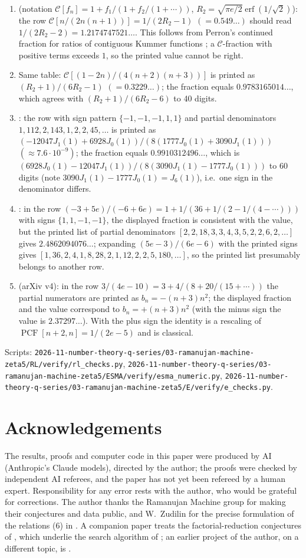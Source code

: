 \documentclass[11pt]{amsart}
\theoremstyle{definition}
\theoremstyle{remark}
\numberwithin{equation}{section}
\newcommand{\PCF}{\operatorname{PCF}}
\newcommand{\file}[1]{\nolinkurl{2026-11-number-theory-q-series/03-ramanujan-machine-zeta5/#1}}
\begin{document}
\begin{enumerate}[leftmargin=1.5em]
\item \cite[Table~3, arXiv v2]{BHK} (notation $\mathcal C[f_n]=1+f_1/(1+f_2/(1+\cdots))$, $R_2=\sqrt{\pi e/2}\operatorname{erf}(1/\sqrt2)$): the row $\mathcal C[n/(2n(n+1))]=1/(2R_2-1)$ $(=0.549\ldots)$ should read $1/(2R_2-2)=1.2174747521\ldots$. This follows from Perron's continued fraction for ratios of contiguous Kummer functions \cite[vol.~II]{Per}; a $\mathcal C$-fraction with positive terms exceeds $1$, so the printed value cannot be right.
\item Same table: $\mathcal C[(1-2n)/(4(n+2)(n+3))]$ is printed as $(R_2+1)/(6R_2-1)$ $(=0.3229\ldots)$; the fraction equals $0.9783165014\ldots$, which agrees with $(R_2+1)/(6R_2-6)$ to 40 digits.
\item \cite[Table~3, arXiv v2]{ESMA}: the row with sign pattern $\{-1,-1,-1,1,1\}$ and partial denominators $1,112,2,143,1,2,2,45,\dots$ is printed as $(-12047J_1(1)+6928J_0(1))/(8(1777J_0(1)+3090J_1(1)))$ $(\approx7.6\cdot10^{-9})$; the fraction equals $0.9910312496\ldots$, which is $(6928J_0(1)-12047J_1(1))/(8(3090J_1(1)-1777J_0(1)))$ to 60 digits (note $3090J_1(1)-1777J_0(1)=J_6(1)$), i.e.\ one sign in the denominator differs.
\item \cite[Table~1, arXiv v2]{ESMA}: in the row $(-3+5e)/(-6+6e)=1+1/(36+1/(2-1/(4-\cdots)))$ with signs $\{1,1,-1,-1\}$, the displayed fraction is consistent with the value, but the printed list of partial denominators $[2,2,18,3,3,4,3,5,2,2,6,2,\dots]$ gives $2.4862094076\ldots$; expanding $(5e-3)/(6e-6)$ with the printed signs gives $[1,36,2,4,1,8,28,2,1,12,2,2,5,180,\dots]$, so the printed list presumably belongs to another row.
\item \cite[Table~3]{RM} (arXiv v4): in the row $3/(4e-10)=3+4/(8+20/(15+\cdots))$ the partial numerators are printed as $b_n=-(n+3)n^2$; the displayed fraction and the value correspond to $b_n=+(n+3)n^2$ (with the minus sign the value is $2.37297\ldots$). With the plus sign the identity is a rescaling of $\PCF[n+2,n]=1/(2e-5)$ and is classical.
\end{enumerate}
Scripts: \file{RL/verify/rl_checks.py}, \file{ESMA/verify/esma_numeric.py}, \file{E/verify/e_checks.py}.

\section*{Acknowledgements}
The results, proofs and computer code in this paper were produced by AI (Anthropic's Claude models), directed by the author; the proofs were checked by independent AI referees, and the paper has not yet been refereed by a human expert. Responsibility for any error rests with the author, who would be grateful for corrections. The author thanks the Ramanujan Machine group for making their conjectures and data public, and W.~Zudilin for the precise formulation of the relations (6) in \cite{Zud}. A companion paper \cite{Sha2} treats the factorial-reduction conjectures of \cite{BDNM}, which underlie the search algorithm of \cite{EDCK}; an earlier project of the author, on a different topic, is \cite{Sha}.
\end{document}
